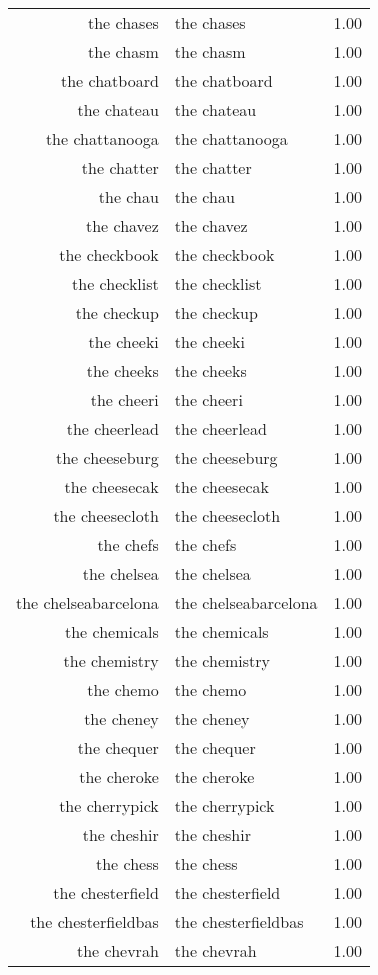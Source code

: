 \begin{table}[ht]
\begin{tabular}{rlr}
  the chases & the chases & 1.00 \\ 
  the chasm & the chasm & 1.00 \\ 
  the chatboard & the chatboard & 1.00 \\ 
  the chateau & the chateau & 1.00 \\ 
  the chattanooga & the chattanooga & 1.00 \\ 
  the chatter & the chatter & 1.00 \\ 
  the chau & the chau & 1.00 \\ 
  the chavez & the chavez & 1.00 \\ 
  the checkbook & the checkbook & 1.00 \\ 
  the checklist & the checklist & 1.00 \\ 
  the checkup & the checkup & 1.00 \\ 
  the cheeki & the cheeki & 1.00 \\ 
  the cheeks & the cheeks & 1.00 \\ 
  the cheeri & the cheeri & 1.00 \\ 
  the cheerlead & the cheerlead & 1.00 \\ 
  the cheeseburg & the cheeseburg & 1.00 \\ 
  the cheesecak & the cheesecak & 1.00 \\ 
  the cheesecloth & the cheesecloth & 1.00 \\ 
  the chefs & the chefs & 1.00 \\ 
  the chelsea & the chelsea & 1.00 \\ 
  the chelseabarcelona & the chelseabarcelona & 1.00 \\ 
  the chemicals & the chemicals & 1.00 \\ 
  the chemistry & the chemistry & 1.00 \\ 
  the chemo & the chemo & 1.00 \\ 
  the cheney & the cheney & 1.00 \\ 
  the chequer & the chequer & 1.00 \\ 
  the cheroke & the cheroke & 1.00 \\ 
  the cherrypick & the cherrypick & 1.00 \\ 
  the cheshir & the cheshir & 1.00 \\ 
  the chess & the chess & 1.00 \\ 
  the chesterfield & the chesterfield & 1.00 \\ 
  the chesterfieldbas & the chesterfieldbas & 1.00 \\ 
  the chevrah & the chevrah & 1.00 \\ 

\end{tabular}
\end{table}
